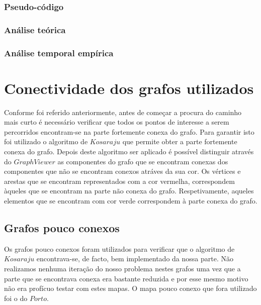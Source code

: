 \documentclass[article, a4paper, 12pt, oneside]{memoir}
\begin{document}
\subsection{Pseudo-código}
\subsection{Análise teórica}
\subsection{Análise temporal empírica}

\newpage
\chapter[Conectividade dos grafos utilizados][Conectividade dos grafos utilizados]{Conectividade dos grafos utilizados} \label{\thechapter}

Conforme foi referido anteriormente, antes de começar a procura do caminho mais curto é necessário verificar que todos os pontos de interesse a serem percorridos encontram-se na
parte fortemente conexa do grafo. Para garantir isto foi utilizado o algoritmo de $Kosaraju$ que permite obter a parte fortemente conexa do grafo. Depois deste algoritmo ser aplicado
é possível distinguir através do $GraphViewer$ as componentes do grafo que se encontram conexas dos componentes que não se encontram conexos atráves da sua cor. Os vértices e arestas
que se encontram representados com a cor vermelha, correspondem àqueles que se encontram na parte não conexa do grafo. Respetivamente, aqueles elementos que se encontram com cor
verde correspondem à parte conexa do grafo.

\section{Grafos pouco conexos}
Os grafos pouco conexos foram utilizados para verificar que o algoritmo de $Kosaraju$ encontrava-se, de facto, bem implementado da nossa parte. Não 
realizamos nenhuma iteração do nosso problema nestes grafos uma vez que a parte que se encontrava conexa era bastante reduzida e por esse mesmo motivo não era profícuo
testar com estes mapas.
O mapa pouco conexo que fora utilizado foi o do $Porto$.
\end{document}
